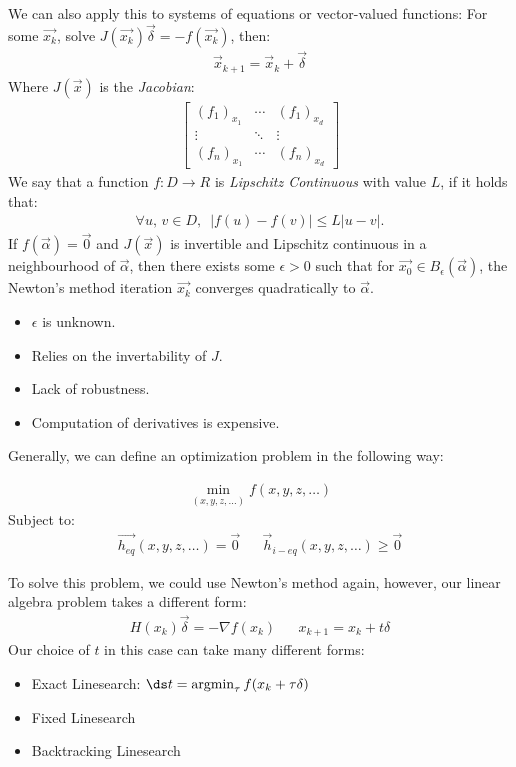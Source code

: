 \documentclass{article}
\begin{document}
We can also apply this to systems of equations or vector-valued functions:
\gap
For some $\vec{x_k}$, solve $J(\vec{x_k})\vec{\delta} = - f(\vec{x_k})$, then:
\begin{align*}
  \vec{x}_{k + 1} = \vec{x}_k + \vec{\delta}
\end{align*}
Where $J(\vec{x})$ is the \textit{Jacobian}:
\begin{align*}
  \begin{bmatrix}
    (f_1)_{x_1} & \cdots & (f_1)_{x_d}\\
    \vdots & \ddots & \vdots\\
    (f_n)_{x_1} & \cdots & (f_n)_{x_d}
  \end{bmatrix}
\end{align*}
 We say that a function $f: D \to R$ is \textit{Lipschitz Continuous} with value $L$, if it holds that:
\begin{align*}
  \forall u,\, v \in D,\,\,\, |f(u) - f(v)| \leq L |u-v|.
\end{align*}
 If $f(\vec{\alpha}) = \vec{0}$ and $J(\vec{x})$ is invertible and Lipschitz continuous in a neighbourhood of $\vec{\alpha}$, then there exists some $\epsilon > 0$ such that for $\vec{x_0} \in B_\epsilon(\vec{\alpha})$, the Newton's method iteration $\vec{x_k}$ converges quadratically to $\vec{\alpha}$.
\gap
{}
\begin{itemize}
\item $\epsilon$ is unknown.
\item Relies on the invertability of $J$.
\item Lack of robustness.
\item Computation of derivatives is expensive.
\end{itemize}


Generally, we can define an optimization problem in the following way:

\begin{align*}
  \min_{(x, y, z, \ldots)} f(x, y, z, \ldots)
\end{align*}
Subject to:
\begin{align*}
  \vec{h_{eq}} (x, y, z, \ldots) = \vec{0} && \vec{h}_{i-eq}(x, y, z, \ldots) \geq \vec{0}
\end{align*}

To solve this problem, we could use Newton's method again, however, our linear algebra problem takes a different form:
\begin{align*}
  H(x_k) \vec{\delta} = -\nabla f(x_k) && x_{k + 1} = x_k + t \delta
\end{align*}
Our choice of $t$ in this case can take many different forms:
\begin{itemize}
\item Exact Linesearch: $\ds t = \operatorname*{argmin}_\tau f(x_k + \tau \delta)$
\item Fixed Linesearch
\item Backtracking Linesearch
\end{itemize}
\end{document}
